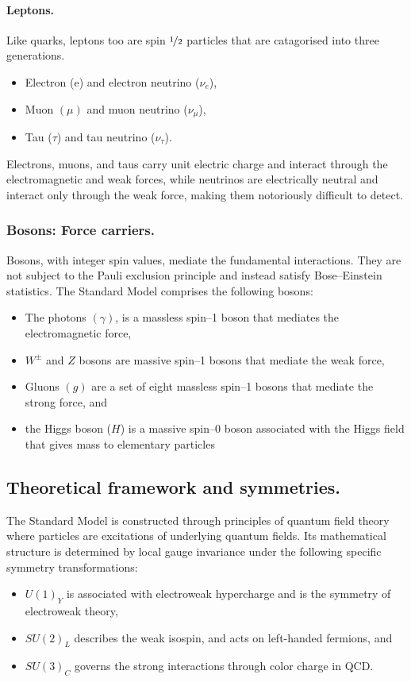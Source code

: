 \begin{definition}
\paragraph{Leptons.}
Like quarks, leptons too are spin \(\nicefrac12\) particles that are catagorised into three generations.
\begin{itemize}
    \item Electron (e) and electron neutrino ($\nu_e$),
    \item Muon $(\mu)$ and muon neutrino ($\nu_\mu$),
    \item Tau ($\tau$) and tau neutrino ($\nu_\tau$).
\end{itemize}

Electrons, muons, and taus carry unit electric charge and interact through the electromagnetic and weak forces, while neutrinos are electrically neutral and interact only through the weak force, making them notoriously difficult to detect.

\subsubsection{Bosons: Force carriers.}
Bosons, with integer spin values, mediate the fundamental interactions.
%
They are not subject to the Pauli exclusion principle and instead satisfy Bose--Einstein statistics.
%
The Standard Model comprises the following bosons:
\begin{itemize}
    \item The photons $(\gamma)$, is a massless spin--1 boson that mediates the electromagnetic force,
    \item $W^\pm$ and $Z$ bosons are massive spin--1 bosons that mediate the weak force,
    \item Gluons $(g)$ are a set of eight massless spin--1 bosons that mediate the strong force, and
    \item the Higgs boson ($H$) is a massive spin--0 boson associated with the Higgs field that gives mass to elementary particles
\end{itemize}

\subsection{Theoretical framework and symmetries.}
The Standard Model is constructed through principles of quantum field theory where particles are excitations of underlying quantum fields.
%
Its mathematical structure is determined by local gauge invariance under the following specific symmetry transformations:
\begin{itemize}
    \item $U(1)_Y$ is associated with electroweak hypercharge and is the symmetry of electroweak theory,
    \item $SU(2)_L$ describes the weak isospin, and acts on left-handed fermions, and
    \item $SU(3)_C$ governs the strong interactions through color charge in QCD.
\end{itemize}


\end{definition}
